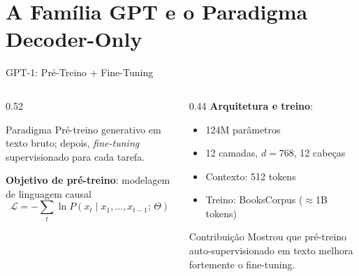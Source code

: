 \documentclass[aspectratio=169, xcolor=dvipsnames]{beamer}
\begin{document}
  \section{A Família GPT e o Paradigma Decoder-Only}

  \begin{frame}{GPT-1: Pré-Treino + Fine-Tuning\footnotemark[1]}
    \begin{columns}[T]
      \begin{column}{0.52\textwidth}
        \begin{block}{Paradigma}
          Pré-treino generativo em texto bruto; depois, \textit{fine-tuning} supervisionado para cada tarefa.
        \end{block}
        \vspace{0.3em}
        \textbf{Objetivo de pré-treino}: modelagem de linguagem causal
        \[
          \mathcal{L} = -\sum_{t} \ln P(x_t \mid x_1,\ldots,x_{t-1};\,\Theta)
        \]
      \end{column}
      \begin{column}{0.44\textwidth}
        \textbf{Arquitetura e treino}:
        \begin{itemize}
          \item 124M parâmetros
          \item 12 camadas, $d=768$, 12 cabeças
          \item Contexto: 512 tokens
          \item Treino: BooksCorpus ($\approx$1B tokens)
        \end{itemize}
        \vspace{0.3em}
        \begin{exampleblock}{Contribuição}
          Mostrou que pré-treino auto-supervisionado em texto melhora fortemente o fine-tuning.
        \end{exampleblock}
      \end{column}
    \end{columns}
  \end{frame}
\end{document}
